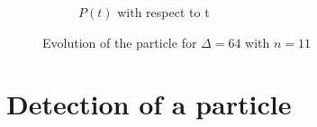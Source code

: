 \documentclass[a4paper,12pt,twoside]{article}
\begin{document}
\begin{figure}[h]
\begin{subfigure}[t]{0.45\textwidth}
    \caption{$P(t)$ with respect to t}
    \label{fig:iii_findn_psi}
  \end{subfigure}
  \caption{Evolution of the particle for $\Delta = 64$ with $n=11$}
  \label{fig:iii_findn}
\end{figure}



\newpage
\section{Detection of a particle}





\end{document}
